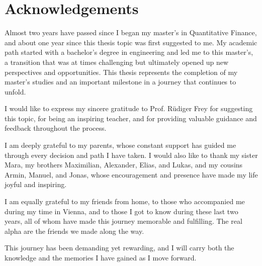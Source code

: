 \section*{Acknowledgements}

Almost two years have passed since I began my master's in Quantitative Finance, and about one year since this thesis topic was first suggested to me. My academic path started with a bachelor's degree in engineering and led me to this master's, a transition that was at times challenging but ultimately opened up new perspectives and opportunities. This thesis represents the completion of my master's studies and an important milestone in a journey that continues to unfold.

I would like to express my sincere gratitude to Prof. Rüdiger Frey for suggesting this topic, for being an inspiring teacher, and for providing valuable guidance and feedback throughout the process.

I am deeply grateful to my parents, whose constant support has guided me through every decision and path I have taken. I would also like to thank my sister Mara, my brothers Maximilian, Alexander, Elias, and Lukas, and my cousins Armin, Manuel, and Jonas, whose encouragement and presence have made my life joyful and inspiring.

I am equally grateful to my friends from home, to those who accompanied me during my time in Vienna, and to those I got to know during these last two years, all of whom have made this journey memorable and fulfilling. The real alpha are the friends we made along the way.

This journey has been demanding yet rewarding, and I will carry both the knowledge and the memories I have gained as I move forward.